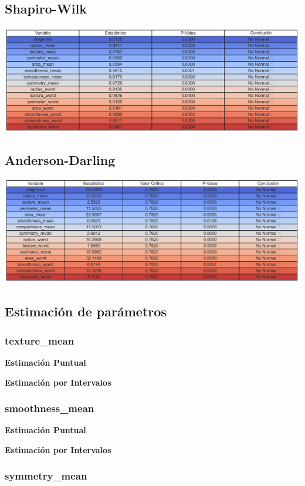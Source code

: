 \documentclass[a4paper, 12pt]{article}
\begin{document}
\subsection*{Shapiro-Wilk}
\includegraphics[width=\textwidth]{../Plots/resumen_shapiro_wilk.png}

\subsection*{Anderson-Darling}
\includegraphics[width=\textwidth]{../Plots/resumen_anderson_darling.png}


\subsection{Estimación de parámetros}

\subsubsection{texture\_mean}

\textbf{Estimación Puntual}

\textbf{Estimación por Intervalos}


\subsubsection{smoothness\_mean}

\textbf{Estimación Puntual}

\textbf{Estimación por Intervalos}


\subsubsection{symmetry\_mean}
\end{document}
